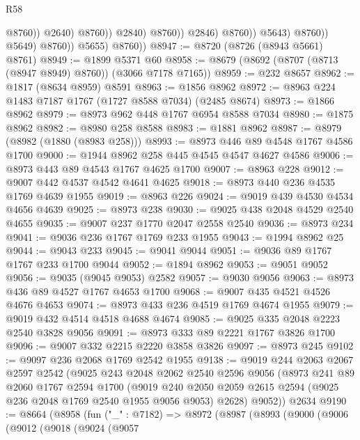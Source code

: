 \begin{lexlean}{R58}
\begin{coremodule}
                                            @8760))
                                        @2640)
                                      @8760))
                                  @2840)
                                @8760))
                            @2846)
                          @8760))
                      @5643)
                    @8760))
                @5649)
              @8760))
          @5655)
        @8760))
@8947 := @8720 (@8726 (@8943 @5661) @8761)
@8949 := @1899 @5371 @60
@8958 := @8679 (@8692 (@8707 (@8713 (@8947 @8949) @8760)) (@3066 @7178 @7165))
@8959 := @232 @8657
@8962 := @1817 (@8634 @8959) @8591
@8963 := @1856 @8962
@8972 := @8963 @224 @1483 @7187 @1767 (@1727 @8588 @7034) (@2485 @8674)
@8973 := @1866 @8962
@8979 := @8973 @962 @448 @1767 @6954 @8588 @7034
@8980 := @1875 @8962
@8982 := @8980 @258 @8588
@8983 := @1881 @8962
@8987 := @8979 (@8982 (@1880 (@8983 @258)))
@8993 := @8973 @446 @89 @4548 @1767 @4586 @1700
@9000 := @1944 @8962 @258 @445 @4545 @4547 @4627 @4586
@9006 := @8973 @443 @89 @4543 @1767 @4625 @1700
@9007 := @8963 @228
@9012 := @9007 @442 @4537 @4542 @4641 @4625
@9018 := @8973 @440 @236 @4535 @1769 @4639 @1955
@9019 := @8963 @226
@9024 := @9019 @439 @4530 @4534 @4656 @4639
@9025 := @8973 @238
@9030 := @9025 @438 @2048 @4529 @2540 @4655
@9035 := @9007 @237 @1770 @2047 @2558 @2540
@9036 := @8973 @234
@9041 := @9036 @236 @1767 @1769 @233 @1955
@9043 := @1994 @8962 @25
@9044 := @9043 @233
@9045 := @9041 @9044
@9051 := @9036 @89 @1767 @1767 @233 @1700 @9044
@9052 := @1894 @8962
@9053 := @9051 @9052
@9056 := @9035 (@9045 @9053) @2582
@9057 := @9030 @9056
@9063 := @8973 @436 @89 @4527 @1767 @4653 @1700
@9068 := @9007 @435 @4521 @4526 @4676 @4653
@9074 := @8973 @433 @236 @4519 @1769 @4674 @1955
@9079 := @9019 @432 @4514 @4518 @4688 @4674
@9085 := @9025 @335 @2048 @2223 @2540 @3828 @9056
@9091 := @8973 @333 @89 @2221 @1767 @3826 @1700
@9096 := @9007 @332 @2215 @2220 @3858 @3826
@9097 := @8973 @245
@9102 := @9097 @236 @2068 @1769 @2542 @1955
@9138 := @9019
    @244
    @2063
    @2067
    @2597
    @2542
    (@9025
      @243
      @2048
      @2062
      @2540
      @2596
      @9056
      (@8973
        @241
        @89
        @2060
        @1767
        @2594
        @1700
        (@9019 @240 @2050 @2059 @2615 @2594 (@9025 @236 @2048 @1769 @2540 @1955 @9056 @9053) @2628)
        @9052))
    @2634
@9190 := @8664
    (@8958
      (fun ("_" : @7182) =>
      @8972
        (@8987
          (@8993
            (@9000
              (@9006
                (@9012
                  (@9018
                    (@9024
                      (@9057

\end{coremodule}
\end{lexlean}
